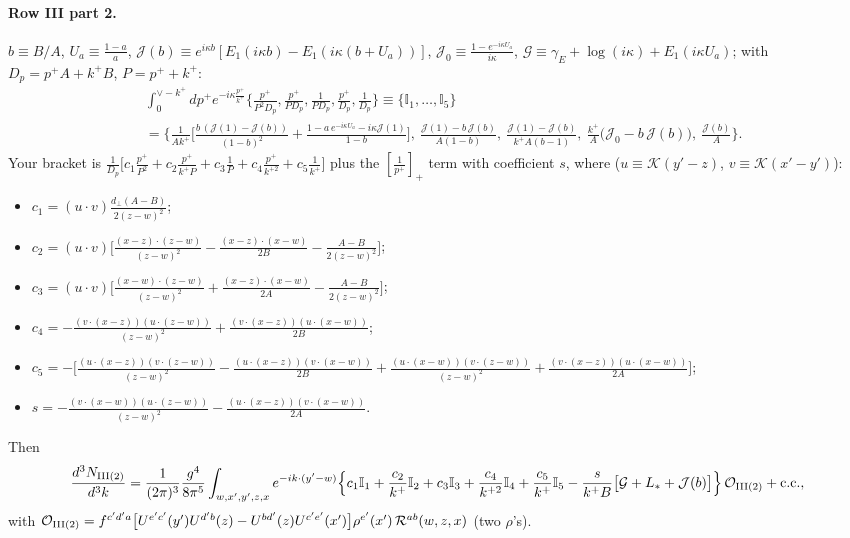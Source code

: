 \documentclass[10pt]{article}
\numberwithin{equation}{section}
\newcommand{\Ls}{L_{*}}
\newcommand{\Rc}{\mathcal R}
\newcommand{\OO}{\mathcal O}
\newcommand{\KK}{\mathcal K}
\newcommand{\pre}{\frac{1}{(2\pi)^3}}
\begin{document}
\paragraph{Row III part 2.} $b\equiv B/A$, $U_a\equiv\frac{1-a}{a}$, $\mathcal J(b)\equiv e^{i\kappa b}[E_1(i\kappa b)-E_1(i\kappa(b+U_a))]$, $\mathcal J_0\equiv\frac{1-e^{-i\kappa U_a}}{i\kappa}$, $\mathcal G\equiv\gamma_E+\log(i\kappa)+E_1(i\kappa U_a)$; with $D_p=p^+A+k^+B$, $P=p^++k^+$:
\begin{align*}
&\int_0^{\vee-k^+}\!\!dp^+e^{-i\kappa\frac{p^+}{k^+}}\Big\{\frac{p^+}{P^2D_p},\frac{p^+}{PD_p},\frac{1}{PD_p},\frac{p^+}{D_p},\frac{1}{D_p}\Big\}\equiv\{\mathbb I_1,\dots,\mathbb I_5\}\\
&=\Big\{\frac{1}{Ak^+}\Big[\frac{b\,(\mathcal J(1)-\mathcal J(b))}{(1-b)^2}+\frac{1-a\,e^{-i\kappa U_a}-i\kappa\mathcal J(1)}{1-b}\Big],\ \frac{\mathcal J(1)-b\,\mathcal J(b)}{A(1-b)},\ \frac{\mathcal J(1)-\mathcal J(b)}{k^+A(b-1)},\ \frac{k^+}{A}\big(\mathcal J_0-b\,\mathcal J(b)\big),\ \frac{\mathcal J(b)}{A}\Big\}.
\end{align*}
Your bracket is $\frac{1}{D_p}\big[c_1\frac{p^+}{P^2}+c_2\frac{p^+}{k^+P}+c_3\frac1P+c_4\frac{p^+}{k^{+2}}+c_5\frac{1}{k^+}\big]$ plus the $[\frac{1}{p^+}]_+$ term with coefficient $s$, where ($u\equiv\KK(y'-z)$, $v\equiv\KK(x'-y')$):
\begin{itemize}
\item $c_1=(u\!\cdot\!v)\frac{d_\perp(A-B)}{2(z-w)^2}$;
\item $c_2=(u\!\cdot\!v)\big[\frac{(x-z)\cdot(z-w)}{(z-w)^2}-\frac{(x-z)\cdot(x-w)}{2B}-\frac{A-B}{2(z-w)^2}\big]$;
\item $c_3=(u\!\cdot\!v)\big[\frac{(x-w)\cdot(z-w)}{(z-w)^2}+\frac{(x-z)\cdot(x-w)}{2A}-\frac{A-B}{2(z-w)^2}\big]$;
\item $c_4=-\frac{(v\cdot(x-z))(u\cdot(z-w))}{(z-w)^2}+\frac{(v\cdot(x-z))(u\cdot(x-w))}{2B}$;
\item $c_5=-\big[\frac{(u\cdot(x-z))(v\cdot(z-w))}{(z-w)^2}-\frac{(u\cdot(x-z))(v\cdot(x-w))}{2B}+\frac{(u\cdot(x-w))(v\cdot(z-w))}{(z-w)^2}+\frac{(v\cdot(x-z))(u\cdot(x-w))}{2A}\big]$;
\item $s=-\frac{(v\cdot(x-w))(u\cdot(z-w))}{(z-w)^2}-\frac{(u\cdot(x-z))(v\cdot(x-w))}{2A}$.
\end{itemize}
Then
\begin{equation}
\frac{d^3N_{\rm III(2)}}{d^3k}=\pre\frac{g^4}{8\pi^5}\int_{w,x',y',z,x}e^{-ik\cdot(y'-w)}\Big\{c_1\mathbb I_1+\frac{c_2}{k^+}\mathbb I_2+c_3\mathbb I_3+\frac{c_4}{k^{+2}}\mathbb I_4+\frac{c_5}{k^+}\mathbb I_5-\frac{s}{k^+B}\big[\mathcal G+\Ls+\mathcal J(b)\big]\Big\}\,\OO_{\rm III(2)}+{\rm c.c.},
\label{eq:III2}
\end{equation}
with $\OO_{\rm III(2)}=f^{c'd'a}\big[U^{e'c'}(y')U^{d'b}(z)-U^{bd'}(z)U^{c'e'}(x')\big]\rho^{e'}(x')\,\Rc^{ab}(w,z,x)$ (two $\rho$'s).
\end{document}
